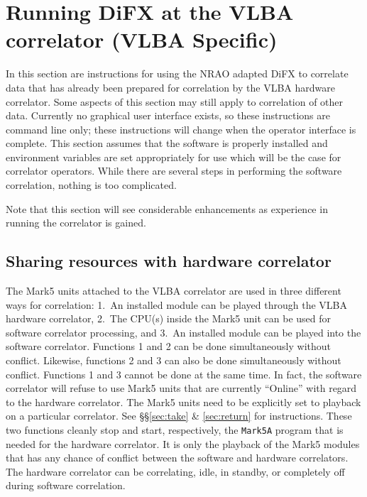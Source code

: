 


\section{Running DiFX at the VLBA correlator {\small (VLBA Specific)}} \label{sec:run}

In this section are instructions for using the NRAO adapted DiFX to correlate data that has already been prepared for correlation by the VLBA hardware correlator.
Some aspects of this section may still apply to correlation of other data.
Currently no graphical user interface exists, so these instructions are command line only; these instructions will change when the operator interface is complete.
This section assumes that the software is properly installed and environment variables are set appropriately for use which will be the case for correlator operators.
While there are several steps in performing the software correlation, nothing is too complicated.

Note that this section will see considerable enhancements as experience in running the correlator is gained.

\subsection{Sharing resources with hardware correlator}

The Mark5 units attached to the VLBA correlator are used in three different ways for correlation: 1.~An installed module can be played through the VLBA hardware correlator, 2.~The CPU(s) inside the Mark5 unit can be used for software correlator processing, and 3.~An installed module can be played into the software correlator.
Functions 1 and 2 can be done simultaneously without conflict.  
Likewise, functions 2 and 3 can also be done simultaneously without conflict.
Functions 1 and 3 cannot be done at the same time.
In fact, the software correlator will refuse to use Mark5 units that are currently ``Online'' with regard to the hardware correlator.
The Mark5 units need to be explicitly set to playback on a particular correlator.  
See \S\S\ref{sec:take} \& \ref{sec:return} for instructions.
These two functions cleanly stop and start, respectively, the {\tt Mark5A} program that is needed for the hardware correlator.
It is only the playback of the Mark5 modules that has any chance of conflict between the software and hardware correlators.
The hardware correlator can be correlating, idle, in standby, or completely off during software correlation.

